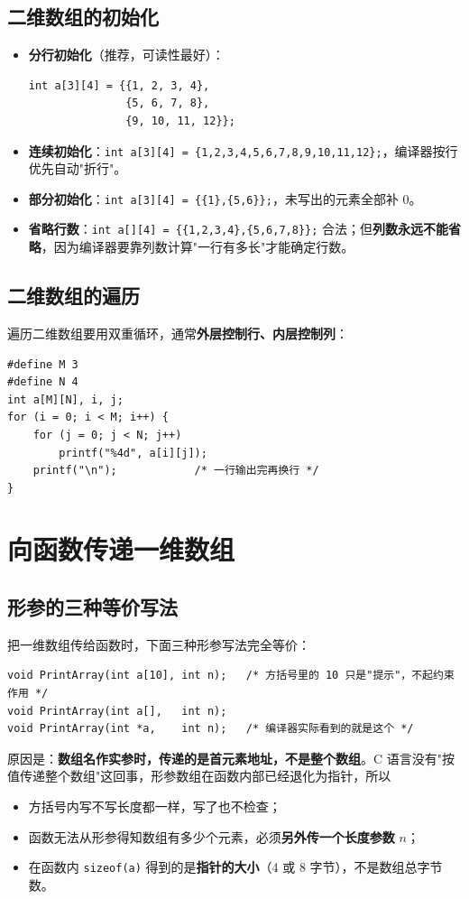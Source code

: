 \subsection{二维数组的初始化}
\begin{itemize}
  \item \textbf{分行初始化}（推荐，可读性最好）：
\begin{lstlisting}
int a[3][4] = {{1, 2, 3, 4},
               {5, 6, 7, 8},
               {9, 10, 11, 12}};
\end{lstlisting}
  \item \textbf{连续初始化}：\texttt{int a[3][4] = \{1,2,3,4,5,6,7,8,9,10,11,12\};}，编译器按行优先自动"折行"。
  \item \textbf{部分初始化}：\texttt{int a[3][4] = \{\{1\},\{5,6\}\};}，未写出的元素全部补 0。
  \item \textbf{省略行数}：\texttt{int a[][4] = \{\{1,2,3,4\},\{5,6,7,8\}\};} 合法；但\textbf{列数永远不能省略}，因为编译器要靠列数计算"一行有多长"才能确定行数。
\end{itemize}

\subsection{二维数组的遍历}
遍历二维数组要用双重循环，通常\textbf{外层控制行、内层控制列}：
\begin{lstlisting}
#define M 3
#define N 4
int a[M][N], i, j;
for (i = 0; i < M; i++) {
    for (j = 0; j < N; j++)
        printf("%4d", a[i][j]);
    printf("\n");            /* 一行输出完再换行 */
}
\end{lstlisting}


\section{向函数传递一维数组}
\subsection{形参的三种等价写法}
把一维数组传给函数时，下面三种形参写法完全等价：
\begin{lstlisting}
void PrintArray(int a[10], int n);   /* 方括号里的 10 只是"提示"，不起约束作用 */
void PrintArray(int a[],   int n);
void PrintArray(int *a,    int n);   /* 编译器实际看到的就是这个 */
\end{lstlisting}
原因是：\textbf{数组名作实参时，传递的是首元素地址，不是整个数组}。C 语言没有"按值传递整个数组"这回事，形参数组在函数内部已经退化为指针，所以
\begin{itemize}
  \item 方括号内写不写长度都一样，写了也不检查；
  \item 函数无法从形参得知数组有多少个元素，必须\textbf{另外传一个长度参数} $n$；
  \item 在函数内 \texttt{sizeof(a)} 得到的是\textbf{指针的大小}（4 或 8 字节），不是数组总字节数。
\end{itemize}

